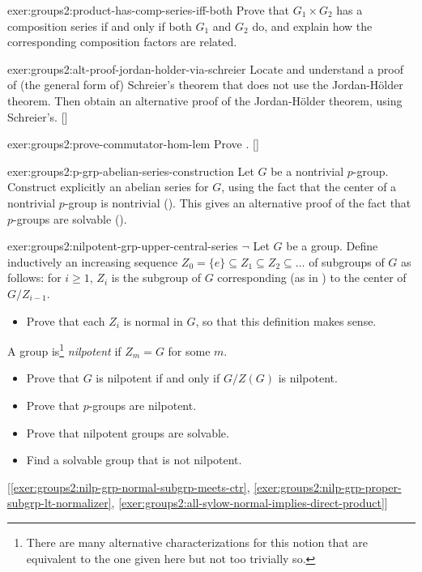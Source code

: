 \begin{exer}{}{exer:groups2:product-has-comp-series-iff-both}
  Prove that $G_1 \times G_2$ has a composition series if and only if
  both $G_1$ and $G_2$ do, and explain how the corresponding
  composition factors are related.
\end{exer}
\begin{exer}{}{exer:groups2:alt-proof-jordan-holder-via-schreier}
  \exerused Locate and understand a proof of (the general form of)
  Schreier's theorem that does not use the Jordan-H\"older
  theorem. Then obtain an alternative proof of the Jordan-H\"older
  theorem, using
  Schreier's. []
\end{exer}

\begin{exer}{}{exer:groups2:prove-commutator-hom-lem}
  \exerused Prove
  . []
\end{exer}
\begin{exer}{}{exer:groups2:p-grp-abelian-series-construction}
  Let $G$ be a nontrivial $p$-group. Construct explicitly an abelian
  series for $G$, using the fact that the center of a nontrivial
  $p$-group is nontrivial
  (). This gives an
  alternative proof of the fact that $p$-groups are solvable
  ().
\end{exer}
\begin{exer}{}{exer:groups2:nilpotent-grp-upper-central-series}
  $\lnot$ Let $G$ be a group. Define inductively an increasing
  sequence $Z_0 = \{e\} \subseteq Z_1 \subseteq Z_2 \subseteq \dots$
  of subgroups of $G$ as follows: for $i \geq 1$, $Z_i$ is the
  subgroup of $G$ corresponding (as in
  ) to the center
  of $G/Z_{i-1}$.
  \begin{itemize}
  \item Prove that each $Z_i$ is normal in $G$, so that this
    definition makes sense.
  \end{itemize}
  A group is\footnote{There are many alternative characterizations for
    this notion that are equivalent to the one given here but not too
    trivially so.}  \emph{nilpotent} if $Z_m = G$ for some $m$.
  \begin{itemize}
  \item Prove that $G$ is nilpotent if and only if $G/Z(G)$ is
    nilpotent.
  \item Prove that $p$-groups are nilpotent.
  \item Prove that nilpotent groups are solvable.
  \item Find a solvable group that is not nilpotent.
  \end{itemize} [\ref{exer:groups2:nilp-grp-normal-subgrp-meets-ctr},
  \ref{exer:groups2:nilp-grp-proper-subgrp-lt-normalizer},
  \ref{exer:groups2:all-sylow-normal-implies-direct-product}]
\end{exer}
